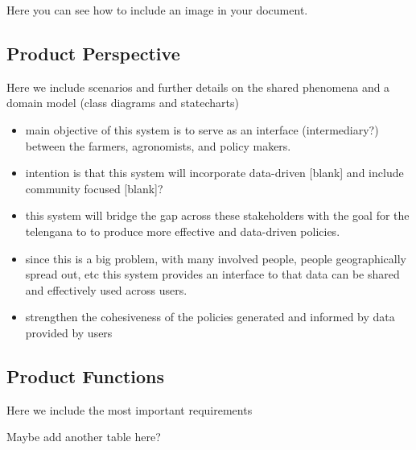 Here you can see how to include an image in your document.
%

%


\subsection{Product Perspective}
Here we include scenarios and further details on the shared phenomena and a domain model (class diagrams and statecharts)


\begin{itemize}
\item
main objective of this system is to serve as an interface (intermediary?) between the farmers, agronomists, and policy makers. 
\item
intention is that this system will incorporate data-driven [blank] and include community focused [blank]? 
\item
this system will bridge the gap across these stakeholders with the goal for the telengana to to produce more effective and data-driven policies.
\item
since this is a big problem, with many involved people, people geographically spread out, etc this system provides an interface to that data can be shared and effectively used across users. 
\item
strengthen the cohesiveness of the policies generated and informed by data provided by users
\end{itemize}


\subsection{Product Functions}
Here we include the most important requirements
\par
Maybe add another table here?

